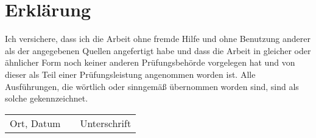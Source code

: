 \chapter*{Erklärung}
	Ich versichere, dass ich die Arbeit ohne fremde Hilfe und ohne
	Benutzung anderer als der angegebenen Quellen angefertigt habe und dass
	die Arbeit in gleicher oder ähnlicher Form noch keiner anderen
	Prüfungsbehörde vorgelegen hat und von dieser als Teil einer
	Prüfungsleistung angenommen worden ist. Alle Ausführungen, die wörtlich
	oder sinngemäß übernommen worden sind, sind als solche
	gekennzeichnet.\\
	\vspace{27pt}

	\begin{center}
		\begin{tabular}{l p{} r}
			\cline{1-1} \cline{3-3}
			\begin{minipage}[t]{0.4\textwidth}
				\centering
				Ort, Datum
			\end{minipage}
			&&  
			\begin{minipage}[t]{0.4\textwidth}
				\centering
				Unterschrift
			\end{minipage}
	\end{tabular}
\end{center}

